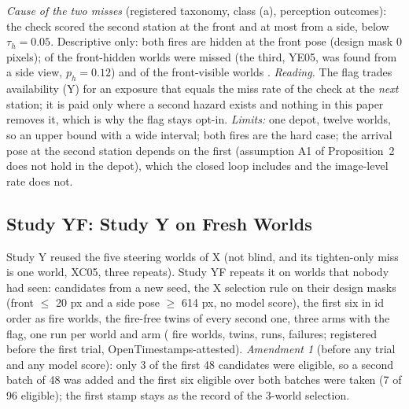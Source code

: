 \documentclass[conference]{IEEEtran}
\begin{document}
\emph{Cause of the two misses} (registered taxonomy, class (a), perception outcomes): the check scored the second station \YEReadFrontMiss{} at the front and at most \YEReadSideMax{} from a side, below $\tau_h=0.05$. Descriptive only: both fires are hidden at the front pose (design mask 0 pixels); of the front-hidden worlds \YEFrontHiddenMissed{} were missed (the third, YE05, was found from a side view, $p_h=0.12$) and of the front-visible worlds \YEFrontVisibleMissed. \emph{Reading.} The flag trades availability (Y) for an exposure that equals the miss rate of the check at the \emph{next} station; it is paid only where a second hazard exists and nothing in this paper removes it, which is why the flag stays opt-in. \emph{Limits:} one depot, twelve worlds, so an upper bound with a wide interval; both fires are the hard case; the arrival pose at the second station depends on the first (assumption A1 of Proposition~2 does not hold in the depot), which the closed loop includes and the image-level rate does not.

\subsection{Study YF: Study Y on Fresh Worlds}\label{sec:moved-yf}
Study Y reused the five steering worlds of X (not blind, and its tighten-only miss is one world, XC05, three repeats). Study YF repeats it on worlds that nobody had seen: candidates from a new seed, the X selection rule on their design masks (front $\le$ 20 px and a side pose $\ge$ 614 px, no model score), the first six in id order as fire worlds, the fire-free twins of every second one, three arms with the flag, one run per world and arm (\YFFireWorlds{} fire worlds, \YFTwinWorlds{} twins, \YFN{} runs, \YFFailed{} failures; registered before the first trial, OpenTimestamps-attested). \emph{Amendment 1} (before any trial and any model score): only 3 of the first 48 candidates were eligible, so a second batch of 48 was added and the first six eligible over both batches were taken (7 of 96 eligible); the first stamp stays as the record of the 3-world selection.
\end{document}

